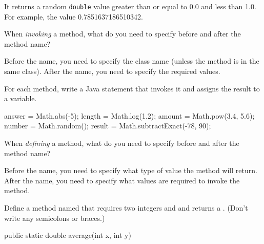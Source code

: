 \begin{answer}
It returns a random \texttt{double} value greater than or equal to 0.0 and less than 1.0.
For example, the value 0.7851637186510342.
\end{answer}


\Q When \emph{invoking} a method, what do you need to specify before and after the method name?

\begin{answer}
Before the name, you need to specify the class name (unless the method is in the same class).
After the name, you need to specify the required values.
\end{answer}


\Q For each method, write a Java statement that invokes it and assigns the result to a variable.

\begin{answer}[8em]
\vspace{-1ex}
\begin{javaans}
answer = Math.abs(-5);
length = Math.log(1.2);
amount = Math.pow(3.4, 5.6);
number = Math.random();
result = Math.subtractExact(-78, 90);
\end{javaans}
\end{answer}


\Q When \emph{defining} a method, what do you need to specify before and after the method name?

\begin{answer}
Before the name, you need to specify what type of value the method will return.
After the name, you need to specify what values are required to invoke the method.
\end{answer}


\Q Define a method named  that requires two integers  and  and returns a . (Don't write any semicolons or braces.)

\begin{answer}
\begin{javaans}
public static double average(int x, int y)
\end{javaans}
\end{answer}




